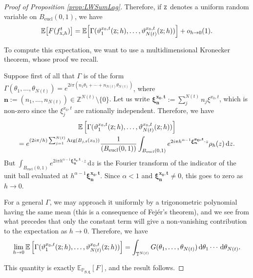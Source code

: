 \documentclass[10pt]{amsart}
\newcommand{\NoChangel}[1]{%
\expandafter\let\csname old\string#1\endcsname=#1
\let#1=\relax
\newcommand{#1}{\mathcode`l="716C\csname old\string#1\endcsname\mathcode`l="7160 }%
}
\newcommand{\rd}{\,\mathrm{d}}
\newcommand{\eucl}{\mathrm{eucl}}
\DeclareMathOperator{\Arg}{Arg}
\theoremstyle{plain}
\theoremstyle{definition}
\newcommand{\E}{\mathbb{E}}
\newcommand{\Z}{\mathbb{Z}}
\newcommand{\T}{\mathbb{T}}
\DeclareMathOperator{\Vol}{Vol}\NoChangel{\Vol}
\begin{document}
\begin{proof}[Proof of Proposition \ref{prop:LWSumLag}]
Therefore, if $\textsc{z}$ denotes a uniform random variable on $B_{\eucl}(0,1)$, we have
\[
\E \bigl[F(f^t_{\textsc{x},h})\bigr] =\E \Bigl[ \Gamma(\vartheta_1^{x_0,t}(\textsc{z}; h),\dots,\vartheta_{N(t)}^{x_0,t}(\textsc{z}; h))\Bigr] + o_{h\to 0}(1).
\]

To compute this expectation, we want to use a multidimensional Kronecker theorem, whose proof we recall.

Suppose first of all that $\Gamma$ is of the form $\Gamma (\theta_1,\dots, \theta_{N(t)})= e^{2i\pi(n_1\theta_1+\cdots+n_{N(t)}\theta_{N(t)})}$, where $\boldsymbol{n}:=(n_1,\dots,n_{N(t)})\in\Z^{N(t)}\setminus\{0\}$. Let us write $\boldsymbol{\xi^{x_0,t}_n}:=\sum_j^{N(t)}n_j\xi^{x_0,t}$, which is non-zero since the $\xi^{x_0,t}_j$ are rationally independent. Therefore, we have
\begin{multline*}
\E \left[ \Gamma(\vartheta_1^{x_0,t}(\textsc{z}; h),\dots,\vartheta_{N(t)}^{x_0,t}(\textsc{z}; h))\right]\\
=e^{(2i\pi/h)\sum_{j=1}^{N(t)} \Arg(B_{j,t}(x_0))} \frac{1}{\Vol(B_{\eucl}(0,1))}\int_{B_{\eucl}(0,1)}e^{2i\pi h^{\alpha-1}\boldsymbol{\xi^{x_0,t}_n}\cdot z}\rho_h(z)\rd z.
\end{multline*}
But $\int_{B_{\eucl}(0,1)}e^{2i\pi h^{\alpha-1}\boldsymbol{\xi^{x_0,t}_n}\cdot z}\rd z$ is the Fourier transform of the indicator of the unit ball evaluated at $h^{\alpha-1}\boldsymbol{\xi^{x_0,t}_n}$. Since $\alpha<1$ and $\boldsymbol{\xi^{x_0,t}_n}\neq 0$, this goes to zero as $h\to 0$.

For a general $\Gamma$, we may approach it uniformly by a trigonometric polynomial having the same mean (this is a consequence of Fejér's theorem), and we see from what precedes that only the constant term will give a non-vanishing contribution to the expectation as $h\to 0$. Therefore, we have
\[
\lim\limits_{h\to 0} \E \left[ \Gamma(\vartheta_1^{x_0,t}(\textsc{z}; h),\dots,\vartheta_{N(t)}^{x_0,t}(\textsc{z}; h))\right] = \int_{\T^{N(t)}}G(\theta_1,\dots, \theta_{N(t)}) \rd \theta_1 \cdots\rd \theta_{N(t)}.
\]

This quantity is exactly $\mathbb{E}_{\mathbb{P}_{\boldsymbol{\beta},\boldsymbol{\xi}}}\left[ F\right]$, and the result follows.
\end{proof}
\end{document}
